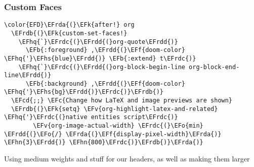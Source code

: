 \documentclass{article}
\newcommand{\EFc}[1]{\textcolor{EFc}{#1}} %
\newcommand{\EFcd}[1]{\textcolor{EFcd}{#1}} %
\newcommand{\EFk}[1]{\textcolor{EFk}{#1}} %
\newcommand{\EFb}[1]{\textcolor{EFb}{#1}} %
\newcommand{\EFf}[1]{\textcolor{EFf}{#1}} %
\newcommand{\EFv}[1]{\textcolor{EFv}{#1}} %
\newcommand{\EFo}[1]{\textcolor{EFo}{#1}} %
\newcommand{\EFhn}[1]{\textcolor{EFhn}{\textbf{#1}}} %
\newcommand{\EFhq}[1]{#1} %
\newcommand{\EFhs}[1]{\textcolor{EFhs}{#1}} %
\newcommand{\EFrda}[1]{\textcolor{EFrda}{#1}} %
\newcommand{\EFrdb}[1]{\textcolor{EFrdb}{#1}} %
\newcommand{\EFrdc}[1]{\textcolor{EFrdc}{#1}} %
\newcommand{\EFrdd}[1]{\textcolor{EFrdd}{#1}} %
\begin{document}
\subsubsection{Custom Faces}
\label{sec:org295457f}
\begin{Code}
\begin{Verbatim}
\color{EFD}\EFrda{(}\EFk{after!} org
  \EFrdb{(}\EFk{custom-set-faces!}
    \EFhq{`}\EFrdc{(}\EFrdd{(}org-quote\EFrdd{)}
      \EFb{:foreground} ,\EFrdd{(}\EFf{doom-color} \EFhq{'}\EFhs{blue}\EFrdd{)} \EFb{:extend} t\EFrdc{)}
    \EFhq{`}\EFrdc{(}\EFrdd{(}org-block-begin-line org-block-end-line\EFrdd{)}
      \EFb{:background} ,\EFrdd{(}\EFf{doom-color} \EFhq{'}\EFhs{bg}\EFrdd{)}\EFrdc{)}\EFrdb{)}
  \EFcd{;;} \EFc{Change how LaTeX and image previews are shown}
  \EFrdb{(}\EFk{setq} \EFv{org-highlight-latex-and-related} \EFhq{'}\EFrdc{(}native entities script\EFrdc{)}
        \EFv{org-image-actual-width} \EFrdc{(}\EFo{min} \EFrdd{(}\EFo{/} \EFrda{(}\EFf{display-pixel-width}\EFrda{)} \EFhn{3}\EFrdd{)} \EFhn{800}\EFrdc{)}\EFrdb{)}\EFrda{)}

\end{Verbatim}
\end{Code}
Using medium weights and stuff for our headers, as well as making them larger
\end{document}
